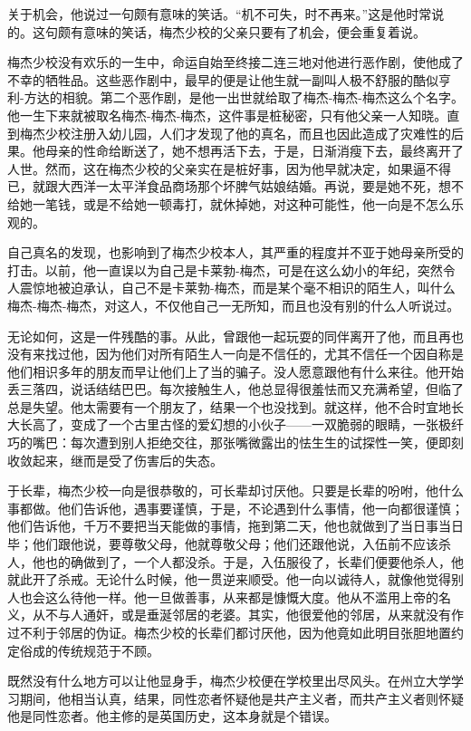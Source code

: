     关于机会，他说过一句颇有意味的笑话。“机不可失，时不再来。”这是他时常说的。这句颇有意味的笑话，梅杰少校的父亲只要有了机会，便会重复着说。

 


    梅杰少校没有欢乐的一生中，命运自始至终接二连三地对他进行恶作剧，使他成了不幸的牺牲品。这些恶作剧中，最早的便是让他生就一副叫人极不舒服的酷似亨利-方达的相貌。第二个恶作剧，是他一出世就给取了梅杰-梅杰-梅杰这么个名字。他一生下来就被取名梅杰-梅杰-梅杰，这件事是桩秘密，只有他父亲一人知晓。直到梅杰少校注册入幼儿园，人们才发现了他的真名，而且也因此造成了灾难性的后果。他母亲的性命给断送了，她不想再活下去，于是，日渐消瘦下去，最终离开了人世。然而，这在梅杰少校的父亲实在是桩好事，因为他早就决定，如果逼不得已，就跟大西洋一太平洋食品商场那个坏脾气姑娘结婚。再说，要是她不死，想不给她一笔钱，或是不给她一顿毒打，就休掉她，对这种可能性，他一向是不怎么乐观的。

    自己真名的发现，也影响到了梅杰少校本人，其严重的程度并不亚于她母亲所受的打击。以前，他一直误以为自己是卡莱勃-梅杰，可是在这么幼小的年纪，突然令人震惊地被迫承认，自己不是卡莱勃-梅杰，而是某个毫不相识的陌生人，叫什么梅杰-梅杰-梅杰，对这人，不仅他自己一无所知，而且也没有别的什么人听说过。

    无论如何，这是一件残酷的事。从此，曾跟他一起玩耍的同伴离开了他，而且再也没有来找过他，因为他们对所有陌生人一向是不信任的，尤其不信任一个因自称是他们相识多年的朋友而早让他们上了当的骗子。没人愿意跟他有什么来往。他开始丢三落四，说话结结巴巴。每次接触生人，他总显得很羞怯而又充满希望，但临了总是失望。他太需要有一个朋友了，结果一个也没找到。就这样，他不合时宜地长大长高了，变成了一个古里古怪的爱幻想的小伙子——一双脆弱的眼睛，一张极纤巧的嘴巴：每次遭到别人拒绝交往，那张嘴微露出的怯生生的试探性一笑，便即刻收敛起来，继而是受了伤害后的失态。

    于长辈，梅杰少校一向是很恭敬的，可长辈却讨厌他。只要是长辈的吩咐，他什么事都做。他们告诉他，遇事要谨慎，于是，不论遇到什么事情，他一向都很谨慎；他们告诉他，千万不要把当天能做的事情，拖到第二天，他也就做到了当日事当日毕；他们跟他说，要尊敬父母，他就尊敬父母；他们还跟他说，入伍前不应该杀人，他也的确做到了，一个人都没杀。于是，入伍服役了，长辈们便要他杀人，他就此开了杀戒。无论什么时候，他一贯逆来顺受。他一向以诚待人，就像他觉得别人也会这么待他一样。他一旦做善事，从来都是慷慨大度。他从不滥用上帝的名义，从不与人通奸，或是垂涎邻居的老婆。其实，他很爱他的邻居，从来就没有作过不利于邻居的伪证。梅杰少校的长辈们都讨厌他，因为他竟如此明目张胆地置约定俗成的传统规范于不顾。
 


    既然没有什么地方可以让他显身手，梅杰少校便在学校里出尽风头。在州立大学学习期间，他相当认真，结果，同性恋者怀疑他是共产主义者，而共产主义者则怀疑他是同性恋者。他主修的是英国历史，这本身就是个错误。

